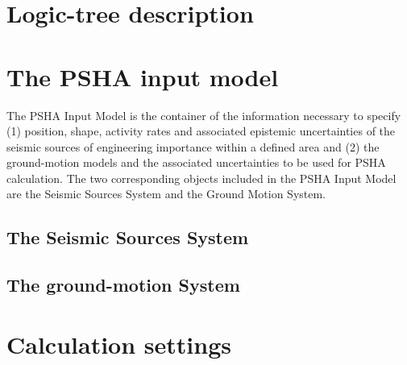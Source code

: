 \section{Logic-tree description}
\label{hazard:logic_tree}

%
\section{The PSHA input model}
\label{hazard:pshainputmodel}
The PSHA Input Model is the container of the information necessary to specify 
(1) position, shape, activity rates and associated epistemic uncertainties
of the seismic sources of engineering importance within a defined area and (2) 
the ground-motion models and the associated uncertainties to be used for PSHA
calculation.
% 
The two corresponding objects included in the PSHA Input Model are the 
Seismic Sources System and the Ground Motion System.
\subsection{The Seismic Sources System}

\subsection{The ground-motion System}

%
\section{Calculation settings}
\label{hazard:calculation_settings}







